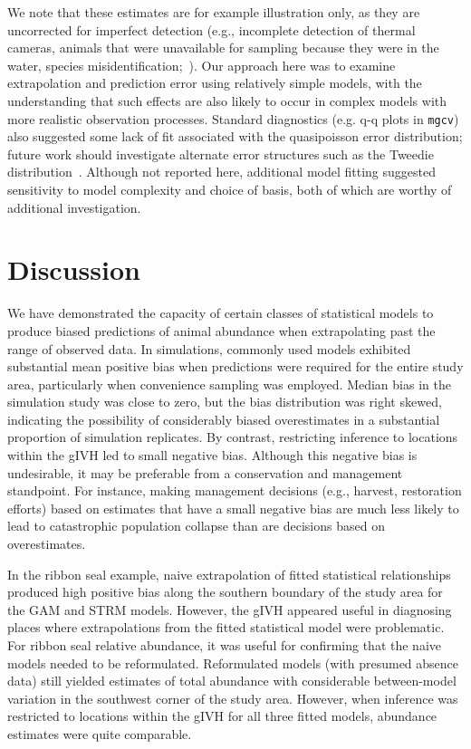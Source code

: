 \documentclass[10pt,letterpaper]{article}
\begin{document}
We note that these estimates are for example illustration only, as they are uncorrected for imperfect detection (e.g., incomplete detection of thermal cameras, animals that were unavailable for sampling because they were in the water, species misidentification;~\cite{ConnEtAl2014}).  Our approach here was to examine extrapolation and prediction error using relatively simple models, with the understanding that such effects are also likely to occur in complex models with more realistic observation processes.  Standard diagnostics (e.g. q-q plots in \texttt{mgcv}) also suggested some lack of fit associated with the quasipoisson error distribution; future work should investigate alternate error structures such as the Tweedie distribution~\cite{MillerEtAl2013}.  Although not reported here, additional model fitting suggested sensitivity to model complexity and choice of basis, both of which are worthy of additional investigation.


\section*{Discussion}

We have demonstrated the capacity of certain classes of statistical models to produce biased predictions of animal abundance when extrapolating past the range of observed data. In simulations, commonly used models exhibited substantial mean positive bias when predictions were required for the entire study area, particularly when convenience sampling was employed. Median bias in the simulation study was close to zero, but the bias distribution was right skewed, indicating the possibility of considerably biased overestimates in a substantial proportion of simulation replicates.  By contrast, restricting inference to locations within the gIVH led to small negative bias.  Although this negative bias is undesirable, it may be preferable from a conservation and management standpoint.  For instance, making management decisions (e.g., harvest, restoration efforts) based on estimates that have a small negative bias are much less likely to lead to catastrophic population collapse than are decisions based on overestimates.

In the ribbon seal example, naive extrapolation of fitted statistical relationships produced high positive bias along the southern boundary of the study area for the GAM and STRM models.  However, the gIVH appeared useful in diagnosing places where extrapolations from the fitted statistical model were problematic.  For ribbon seal relative abundance, it was useful for confirming that the naive models needed to be reformulated.  Reformulated models (with presumed absence data) still yielded estimates of total abundance with considerable between-model variation in the southwest corner of the study area.  However, when inference was restricted to locations within the gIVH for all three fitted models, abundance estimates were quite comparable. 
 
\end{document}
